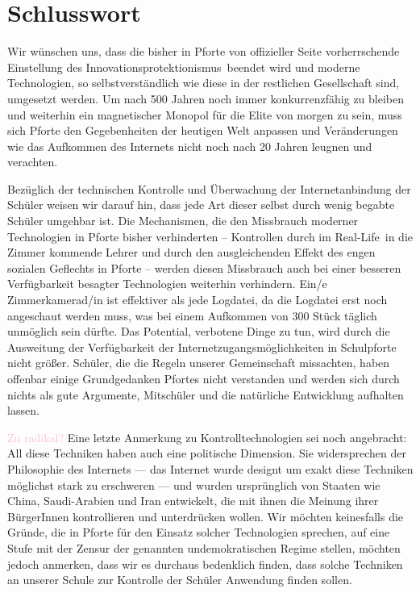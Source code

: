 \documentclass[10pt,a4paper,notitlepage]{scrartcl}
\newcommand{\gfo}{\grqq\ }
\newcommand{\gfu}{\glqq}
\newcommand{\sebastian}[1]{\textcolor{pink}{#1}}
\begin{document}
\section{Schlusswort}
\begin{multicols}{2}
Wir wünschen uns, dass die bisher in Pforte von offizieller Seite vorherrschende Einstellung des \gfu Innovationsprotektionismus\gfo beendet wird und moderne Technologien, so selbstverständlich wie diese in der restlichen Gesellschaft sind, umgesetzt werden. Um nach 500 Jahren noch immer konkurrenzfähig zu bleiben und weiterhin ein magnetischer Monopol für die Elite von morgen zu sein, muss sich Pforte den Gegebenheiten der heutigen Welt anpassen und Veränderungen wie das Aufkommen des Internets nicht noch nach 20 Jahren leugnen und verachten.

Bezüglich der technischen Kontrolle und Überwachung der Internetanbindung der Schüler weisen wir darauf hin, dass jede Art dieser selbst durch wenig begabte Schüler umgehbar ist. Die Mechanismen, die den Missbrauch moderner Technologien in Pforte bisher verhinderten -- Kontrollen durch im \gfu Real-Life\gfo in die Zimmer kommende Lehrer und durch den ausgleichenden Effekt des engen sozialen Geflechts in Pforte -- werden diesen Missbrauch auch bei einer besseren Verfügbarkeit besagter Technologien weiterhin verhindern. Ein/e Zimmerkamerad/in ist effektiver als jede Logdatei, da die Logdatei erst noch angeschaut werden muss, was bei einem Aufkommen von 300 Stück täglich unmöglich sein dürfte. Das Potential, verbotene Dinge zu tun, wird durch die Ausweitung der Verfügbarkeit der Internetzugangsmöglichkeiten in Schulpforte nicht größer. Schüler, die die Regeln unserer Gemeinschaft missachten, haben offenbar einige Grundgedanken Pfortes nicht verstanden und werden sich durch nichts als gute Argumente, Mitschüler und die natürliche Entwicklung aufhalten lassen.

\sebastian{Zu radikal?}
Eine letzte Anmerkung zu Kontrolltechnologien sei noch angebracht: All diese Techniken haben auch eine politische Dimension. Sie widersprechen der Philosophie des Internets --- das Internet wurde designt um exakt diese Techniken möglichst stark zu erschweren --- und wurden ursprünglich von Staaten wie China, Saudi-Arabien und Iran entwickelt, die mit ihnen die Meinung ihrer BürgerInnen kontrollieren und unterdrücken wollen. Wir möchten keinesfalls die Gründe, die in Pforte für den Einsatz solcher Technologien sprechen, auf eine Stufe mit der Zensur der genannten undemokratischen Regime stellen, möchten jedoch anmerken, dass wir es durchaus bedenklich finden, dass solche Techniken an unserer Schule zur Kontrolle der Schüler Anwendung finden sollen.
\end{multicols}
%
%
%
\end{document}
